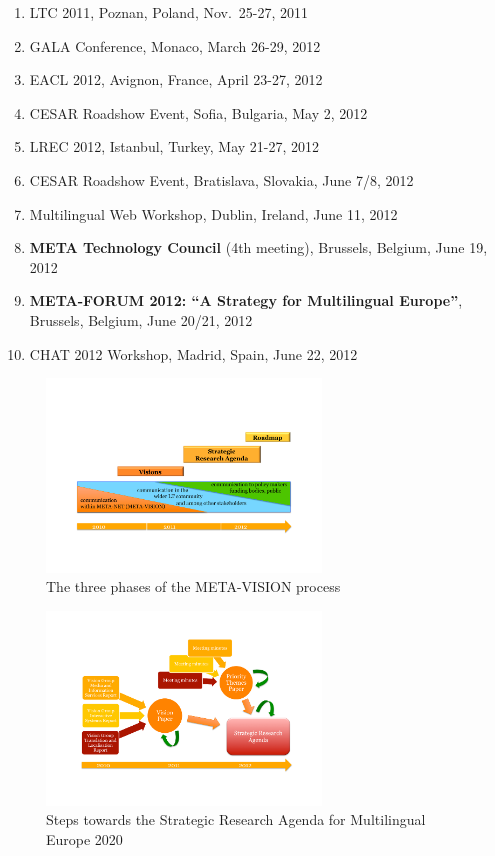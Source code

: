 \documentclass[10pt, plain]{../../metanetpaper}
\begin{document}
\begin{small}
\begin{enumerate}
\item LTC 2011, Poznan, Poland, Nov.~25-27, 2011
\item GALA Conference, Monaco, March 26-29, 2012
\item EACL 2012, Avignon, France, April 23-27, 2012
\item CESAR Roadshow Event, Sofia, Bulgaria, May 2, 2012
\item LREC 2012, Istanbul, Turkey, May 21-27, 2012
\item CESAR Roadshow Event, Bratislava, Slovakia, June 7/8, 2012
\item Multilingual Web Workshop, Dublin, Ireland, June 11, 2012
\item \textbf{META Technology Council} (4th meeting), Brussels, Belgium, June 19, 2012
\item \textbf{META-FORUM 2012: ``A Strategy for Multilingual Europe''}, Brussels, Belgium, June 20/21, 2012
\item CHAT 2012 Workshop, Madrid, Spain, June 22, 2012
\end{enumerate}
\end{small}

\begin{figure}[htb]
  \center
  \includegraphics[width=0.65\textwidth]{../_media/Timeline}
  \caption{The three phases of the META-VISION process}
  \label{fig:sra-timeline}
\end{figure}
 
\begin{figure}[htb]
  \center
  \includegraphics[width=0.65\textwidth]{../_media/Towards-SRA}
  \caption{Steps towards the Strategic Research Agenda for Multilingual Europe 2020}
  \label{fig:towards-sra}
\end{figure}
\end{document}
